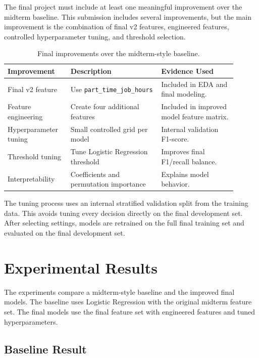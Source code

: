 ﻿\documentclass[12pt,a4paper]{article}
\begin{document}
The final project must include at least one meaningful improvement over the midterm baseline. This submission includes several improvements, but the main improvement is the combination of final v2 features, engineered features, controlled hyperparameter tuning, and threshold selection.

\begin{table}[H]
\centering
\caption{Final improvements over the midterm-style baseline.}
\small
\begin{tabular}{L{0.24\linewidth}L{0.36\linewidth}L{0.30\linewidth}}
\toprule
\textbf{Improvement} & \textbf{Description} & \textbf{Evidence Used} \\
\midrule
Final v2 feature & Use \texttt{part\_time\_job\_hours} & Included in EDA and final modeling. \\
Feature engineering & Create four additional features & Included in improved model feature matrix. \\
Hyperparameter tuning & Small controlled grid per model & Internal validation F1-score. \\
Threshold tuning & Tune Logistic Regression threshold & Improves final F1/recall balance. \\
Interpretability & Coefficients and permutation importance & Explains model behavior. \\
\bottomrule
\end{tabular}
\end{table}

The tuning process uses an internal stratified validation split from the training data. This avoids tuning every decision directly on the final development set. After selecting settings, models are retrained on the full final training set and evaluated on the final development set.

\clearpage

\section{Experimental Results}

The experiments compare a midterm-style baseline and the improved final models. The baseline uses Logistic Regression with the original midterm feature set. The final models use the final feature set with engineered features and tuned hyperparameters.

\subsection{Baseline Result}
\end{document}
